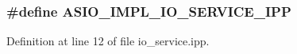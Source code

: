 \subsubsection[{A\+S\+I\+O\+\_\+\+I\+M\+P\+L\+\_\+\+I\+O\+\_\+\+S\+E\+R\+V\+I\+C\+E\+\_\+\+I\+P\+P}]{\setlength{\rightskip}{0pt plus 5cm}\#define A\+S\+I\+O\+\_\+\+I\+M\+P\+L\+\_\+\+I\+O\+\_\+\+S\+E\+R\+V\+I\+C\+E\+\_\+\+I\+P\+P}\label{io__service_8ipp_ad354d8b7eebfc271a94e77ede773aff2}


Definition at line 12 of file io\+\_\+service.\+ipp.

